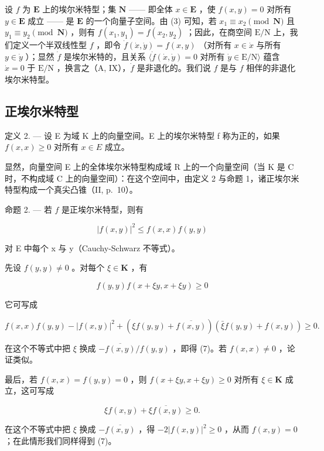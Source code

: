 设 \(f\) 为 \(\mathbf{E}\) 上的埃尔米特型；集 \(\mathbf{N}\) —— 即全体 \(x \in \mathbf{E}\) ，使 \(f(x, y) = 0\) 对所有 \(y \in \mathbf{E}\) 成立 —— 是 \(\mathbf{E}\) 的一个向量子空间。由 (3) 可知，若 \(x_1 \equiv x_2 \pmod{\mathbf{N}}\) 且 \(y_1 \equiv y_2 \pmod{\mathbf{N}}\) ，则有 \(f(x_1, y_1) = f(x_2, y_2)\) ；因此，在商空间 \(\mathrm{E/N}\) 上，我们定义一个半双线性型 \(f\) ，即令 \(\dot{f}(\dot{x}, \dot{y}) = f(x, y)\) （对所有 \(x \in \dot{x}\) 与所有 \(y \in \dot{y}\) ）；显然 \(\dot{f}\) 是埃尔米特的，且关系 \(\langle \dot{f}(\dot{x}, \dot{y}) = 0 \text{ 对所有 } \dot{y} \in \mathrm{E/N} \rangle\) 蕴含 \(\dot{x} = 0 \text{ 于 } \mathrm{E/N}\) ，换言之（A, IX），\(\dot{f}\) 是非退化的。我们说 \(f\) 是与 \(f\) 相伴的非退化埃尔米特型。

\subsection{正埃尔米特型}

定义 2. --- 设 E 为域 K 上的向量空间。E 上的埃尔米特型 f 称为正的，如果 \(f(x, x) \geqslant 0\) 对所有 \(x \in E\) 成立。

显然，向量空间 E 上的全体埃尔米特型构成域 R 上的一个向量空间（当 K 是 C 时，不构成域 C 上的向量空间）：在这个空间中，由定义 2 与命题 1，诸正埃尔米特型构成一个真尖凸锥（II, p.~10）。

命题 2. --- 若 \(f\) 是正埃尔米特型，则有

\[
\left| f (x, y) \right| ^ {2} \leqslant f (x, x) f (y, y)\tag{7}
\]

对 E 中每个 x 与 y（Cauchy-Schwarz 不等式）。

先设 \(f(y, y) \neq 0\) 。对每个 \(\xi \in \mathbf{K}\) ，有

\[
f (y, y) f (x + \xi y, x + \xi y) \geqslant 0
\]

它可写成

\[
f (x, x) f (y, y) - | f (x, y) | ^ {2} + (\xi f (y, y) + \overline {{f (x , y)}}) (\bar {\xi} f (y, y) + f (x, y)) \geqslant 0.
\]

在这个不等式中把 \(\xi\) 换成 \(-\overline{f(x,y)} / f(y,y)\) ，即得 (7)。若 \(f(x,x)\neq 0\) ，论证类似。

最后，若 \(f(x, x) = f(y, y) = 0\) ，则 \(f(x + \xi y, x + \xi y) \geqslant 0\) 对所有 \(\xi \in \mathbf{K}\) 成立，这可写成

\[
\xi f (x, y) + \overline {{{{\xi f (x , y)}}}} \geqslant 0.
\]

在这个不等式中把 \(\xi\) 换成 \(-\overline{f(x,y)}\) ，得 \(-2|f(x,y)|^2 \geqslant 0\) ，从而 \(f(x,y) = 0\) ；在此情形我们同样得到 (7)。

